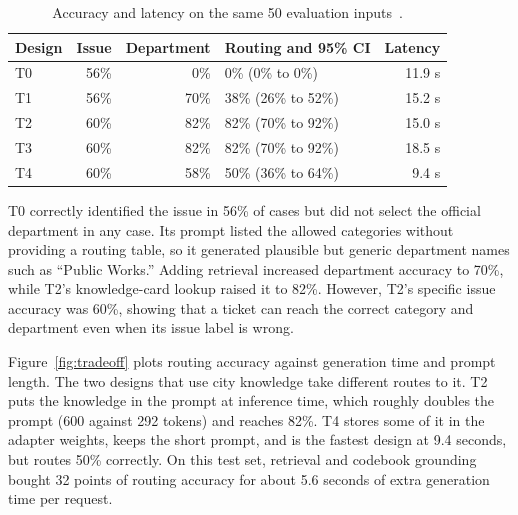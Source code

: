 \documentclass[11pt,letterpaper]{article}
\begin{document}
\begin{table}[htbp]
\centering
\caption{Accuracy and latency on the same 50 evaluation inputs~\cite{archive}.}
\label{tab:routing}
\begin{tabular}{@{}l r r l r@{}}
\toprule
Design & \multicolumn{1}{c}{Issue} & \multicolumn{1}{c}{Department} & Routing and 95\% CI & \multicolumn{1}{c}{Latency} \\
\midrule
T0 & 56\% & 0\%  & 0\% (0\% to 0\%)    & 11.9 s \\
T1 & 56\% & 70\% & 38\% (26\% to 52\%) & 15.2 s \\
T2 & 60\% & 82\% & 82\% (70\% to 92\%) & 15.0 s \\
T3 & 60\% & 82\% & 82\% (70\% to 92\%) & 18.5 s \\
T4 & 60\% & 58\% & 50\% (36\% to 64\%) & 9.4 s \\
\bottomrule
\end{tabular}
\end{table}

T0 correctly identified the issue in 56\% of cases but did not select the official department in any case. Its prompt listed the allowed categories without providing a routing table, so it generated plausible but generic department names such as ``Public Works.'' Adding retrieval increased department accuracy to 70\%, while T2's knowledge-card lookup raised it to 82\%. However, T2's specific issue accuracy was 60\%, showing that a ticket can reach the correct category and department even when its issue label is wrong.

Figure~\ref{fig:tradeoff} plots routing accuracy against generation time and prompt length. The two designs that use city knowledge take different routes to it. T2 puts the knowledge in the prompt at inference time, which roughly doubles the prompt (600 against 292 tokens) and reaches 82\%. T4 stores some of it in the adapter weights, keeps the short prompt, and is the fastest design at 9.4 seconds, but routes 50\% correctly. On this test set, retrieval and codebook grounding bought 32 points of routing accuracy for about 5.6 seconds of extra generation time per request.
\end{document}
